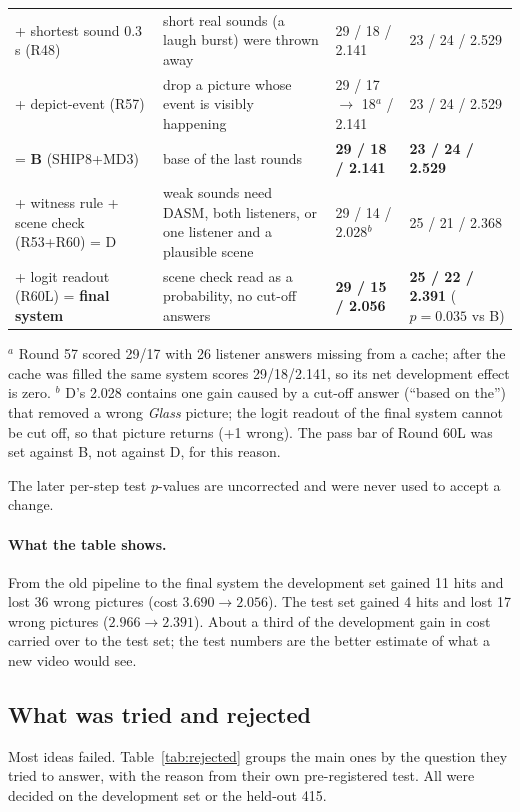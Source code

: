 {\begin{longtable}{L{2.6cm}L{6.1cm}L{2.5cm}L{3.0cm}}
+ shortest sound 0.3\,s (R48) & short real sounds (a laugh burst) were thrown away & 29 / 18 / 2.141 & 23 / 24 / 2.529 \\
+ depict-event (R57) & drop a picture whose event is visibly happening & 29 / 17 $\to$ 18$^{a}$ / 2.141 & 23 / 24 / 2.529 \\
= \textbf{B} (SHIP8+MD3) & base of the last rounds & \textbf{29 / 18 / 2.141} & \textbf{23 / 24 / 2.529} \\
+ witness rule + scene check (R53+R60) = D & weak sounds need DASM, both listeners, or one listener and a plausible scene & 29 / 14 / 2.028$^{b}$ & 25 / 21 / 2.368 \\
+ logit readout (R60L) = \textbf{final system} & scene check read as a probability, no cut-off answers & \textbf{29 / 15 / 2.056} & \textbf{25 / 22 / 2.391} ($p = 0.035$ vs B) \\
\end{longtable}
}

\noindent\footnotesize $^{a}$ Round 57 scored 29/17 with 26 listener answers missing from a cache; after the cache
was filled the same system scores 29/18/2.141, so its net development effect is zero.
$^{b}$ D's 2.028 contains one gain caused by a cut-off answer (``based on the'') that removed a wrong \emph{Glass}
picture; the logit readout of the final system cannot be cut off, so that picture returns (+1 wrong). The pass bar of Round 60L
was set against B, not against D, for this reason.
\normalsize

The later per-step test $p$-values are uncorrected and were never used to accept a change.

\paragraph{What the table shows.} From the old pipeline to the final system the development set gained 11 hits and lost 36 wrong
pictures (cost $3.690 \to 2.056$). The test set gained 4 hits and lost 17 wrong pictures ($2.966 \to 2.391$). About a
third of the development gain in cost carried over to the test set; the test numbers are the better estimate of what a
new video would see.

\subsection{What was tried and rejected}\label{sec:rejected}
Most ideas failed. Table~\ref{tab:rejected} groups the main ones by the question they tried to answer, with the reason
from their own pre-registered test. All were decided on the development set or the held-out 415.

